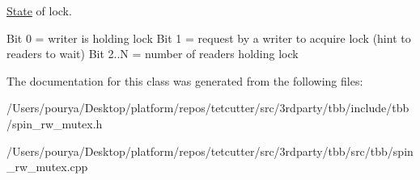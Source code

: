 \hyperlink{structState}{State} of lock. 

Bit 0 = writer is holding lock Bit 1 = request by a writer to acquire lock (hint to readers to wait) Bit 2..N = number of readers holding lock 

The documentation for this class was generated from the following files\+:\begin{DoxyCompactItemize}
\item 
/\+Users/pourya/\+Desktop/platform/repos/tetcutter/src/3rdparty/tbb/include/tbb/spin\+\_\+rw\+\_\+mutex.\+h\item 
/\+Users/pourya/\+Desktop/platform/repos/tetcutter/src/3rdparty/tbb/src/tbb/spin\+\_\+rw\+\_\+mutex.\+cpp\end{DoxyCompactItemize}
